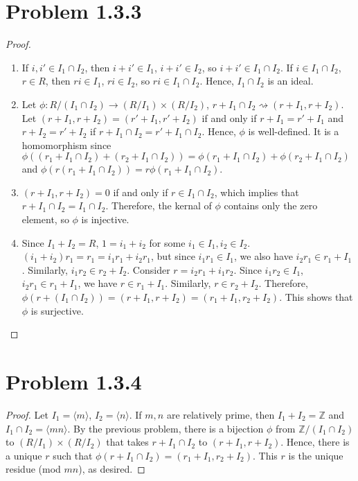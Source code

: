 \documentclass[12pt]{article}
\newcommand{\Z}{\mathbb{Z}}
\begin{document}
\newpage 

\section{Problem 1.3.3}

\begin{proof}
\begin{enumerate}
    \item If $i, i' \in I_1 \cap I_2$, then $i+i'\in I_1$, $i+i' \in I_2$, so $i+i' \in I_1 \cap I_2$. If $i \in I_1 \cap I_2$, $r \in R$, then $ri \in I_1$, $ri \in I_2$, so $ri \in I_1 \cap I_2$. Hence, $I_1 \cap I_2$ is an ideal.
    \item Let $\phi: R/(I_1 \cap I_2) \longrightarrow (R/I_1) \times (R/I_2)$, $r+ I_1 \cap I_2 \rightsquigarrow (r + I_1, r+ I_2)$. Let $(r + I_1, r + I_2) = (r' + I_1, r' + I_2)$ if and only if $r+I_1 = r'+I_1$ and $r + I_2 = r' + I_2$ if $r + I_1 \cap I_2 = r' + I_1 \cap I_2$. Hence, $\phi$ is well-defined. It is a homomorphism since $\phi((r_1+ I_1 \cap I_2) + (r_2 +I_1 \cap I_2))=\phi(r_1+I_1 \cap I_2) + \phi(r_2+I_1 \cap I_2)$ and $\phi(r(r_1+I_1 \cap I_2))=r\phi(r_1+I_1 \cap I_2)$.
    \item $(r + I_1, r + I_2)=0$ if and only if $r \in I_1 \cap I_2$, which implies that $r+I_1\cap I_2 = I_1 \cap I_2$. Therefore, the kernal of $\phi$ contains only the zero element, so $\phi$ is injective.
    \item Since $I_1 + I_2 = R$, $1 = i_1 + i_2$ for some $i_1 \in I_1, i_2 \in I_2$. $(i_1+i_2)r_1=r_1=i_1r_1+i_2r_1$, but since $i_1r_1 \in I_1$, we also have $i_2r_1 \in r_1 + I_1$. Similarly, $i_1r_2 \in r_2 + I_2$. Consider $r = i_2r_1 + i_1r_2$. Since $i_1r_2\in I_1$, $i_2r_1 \in r_1 + I_1$, we have $r \in r_1 + I_1$. Similarly, $r \in r_2 + I_2$. Therefore, $\phi(r+ (I_1 \cap I_2)) = (r+I_1, r+I_2) = (r_1 + I_1, r_2 + I_2)$. This shows that $\phi$ is surjective.
\end{enumerate}
	
\end{proof}

\newpage 

\section{Problem 1.3.4}

\begin{proof}
	Let $I_1 = \langle m \rangle$, $I_2 = \langle n \rangle$. If $m, n$ are relatively prime, then $I_1 + I_2 = \Z$ and $I_1 \cap I_2 = \langle mn \rangle$. By the previous problem, there is a bijection $\phi$ from $\Z/(I_1 \cap I_2)$ to $(R/I_1) \times (R/I_2)$ that takes $r + I_1 \cap I_2$ to $(r+I_1, r+I_2)$. Hence, there is a unique $r$ such that $\phi(r + I_1 \cap I_2) = (r_1 + I_1, r_2 + I_2)$. This $r$ is the unique residue (mod $mn$), as desired.
\end{proof}
\end{document}
